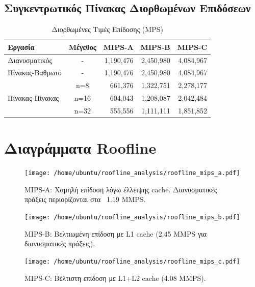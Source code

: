 \documentclass[11pt,a4paper]{article}
\begin{document}
    \subsection{Συγκεντρωτικός Πίνακας Διορθωμένων Επιδόσεων}
    \begin{table}[H]
        \centering
        \caption{Διορθωμένες Τιμές Επίδοσης (MPS)}
        \begin{tabular}{|l|c|r|r|r|}
            \hline
            \textbf{Εργασία} & \textbf{Μέγεθος} & \textbf{MIPS-A} & \textbf{MIPS-B} & \textbf{MIPS-C} \\
            \hline
            Διανυσματικός & - & 1,190,476 & 2,450,980 & 4,084,967 \\
            \hline
            Πίνακας-Βαθμωτό & - & 1,190,476 & 2,450,980 & 4,084,967 \\
            \hline
            \multirow{3}{*}{Πίνακας-Πίνακας} & n=8 & 661,376 & 1,322,751 & 2,278,177 \\
            & n=16 & 604,043 & 1,208,087 & 2,042,484 \\
            & n=32 & 555,556 & 1,111,111 & 1,851,852 \\
            \hline
        \end{tabular}
        \label{tab:corrected_performance}
    \end{table}

    \section{Διαγράμματα Roofline}

    \begin{figure}[H]
        \centering
        \texttt{[image: /home/ubuntu/roofline\_analysis/roofline\_mips\_a.pdf]}
        \caption{MIPS-A: Χαμηλή επίδοση λόγω έλλειψης cache. Διανυσματικές πράξεις περιορίζονται στα ~1.19 MMPS.}
        \label{fig:roofline_mips_a}
    \end{figure}

    \begin{figure}[H]
        \centering
        \texttt{[image: /home/ubuntu/roofline\_analysis/roofline\_mips\_b.pdf]}
        \caption{MIPS-B: Βελτιωμένη επίδοση με L1 cache (2.45 MMPS για διανυσματικές πράξεις).}
        \label{fig:roofline_mips_b}
    \end{figure}

    \begin{figure}[H]
        \centering
        \texttt{[image: /home/ubuntu/roofline\_analysis/roofline\_mips\_c.pdf]}
        \caption{MIPS-C: Βέλτιστη επίδοση με L1+L2 cache (4.08 MMPS).}
        \label{fig:roofline_mips_c}
    \end{figure}
\end{document}
